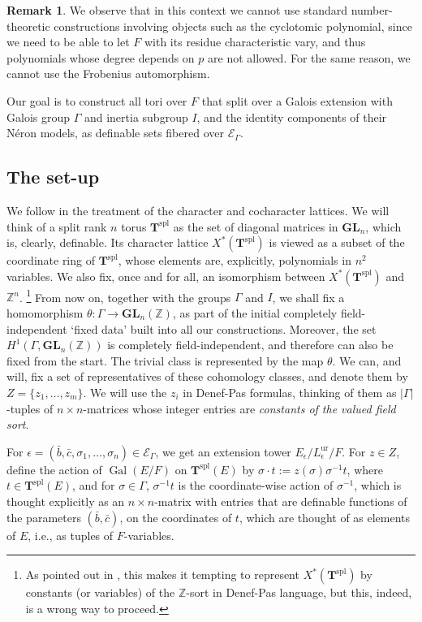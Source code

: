 \documentclass{amsart}
\newcommand{\Z}{{\mathbb Z}}
\newcommand{\GL}{\mathbf {GL}}
\newcommand{\gal}{\operatorname{Gal}}
\newcommand{\ur}{\mathrm{ur}}
\newcommand{\bT}{\mathbf {T}}
\newcommand\cE{{\mathcal E}}
\newcommand\spl{\mathrm{spl}}
\theoremstyle{plain}
\theoremstyle{definition}
\newtheorem{rem}[thm]{Remark}
\begin{document}
\begin{rem} We observe that in this context we cannot use standard number-theoretic constructions involving objects such as the cyclotomic polynomial, since we need to be able to let $F$ with its residue characteristic vary, and thus polynomials whose degree depends on $p$ are not allowed. For the same reason, we cannot use the Frobenius automorphism.  
\end{rem}
Our goal is to construct all tori over $F$ that split over a Galois extension with Galois group 
$\Gamma$ and inertia subgroup $I$, and the identity components of their N\'eron models, as 
definable sets fibered over $\cE_\Gamma$.  

\subsection{The set-up}
We follow \cite{cluckers-hales-loeser} in the treatment of the character and cocharacter lattices.
We will think of a split rank $n$ torus ${\bT}^\spl$ as the set of diagonal matrices in $\GL_n$, which is, clearly, definable. Its character lattice $X^\ast({\bT}^\spl)$ is viewed as a subset of the coordinate ring of $\bT^\spl$, whose elements are, explicitly, polynomials in $n^2$ variables. 
We also fix, once and for all, an isomorphism between $X^\ast(\bT^\spl)$ and $\Z^n$. 
\footnote{As pointed out in \cite{cluckers-hales-loeser}, this makes it tempting to represent 
$X^\ast(\bT^\spl)$ by constants (or variables) of the $\Z$-sort in Denef-Pas language, but this, indeed, is a wrong way to proceed.}
From now on, together with the groups $\Gamma$ and $I$, we shall fix a homomorphism
$\theta:\Gamma \to \GL_n(\Z)$, as part of the initial completely field-independent `fixed data' built into all our constructions.
Moreover, the set $H^1(\Gamma, \GL_n(\Z))$ is completely field-independent, and therefore can also be fixed from the start. The trivial class is represented by the map $\theta$.  We can, and will, fix a set of representatives of these cohomology classes, and denote them by $Z=\{z_1, \dots, z_m\}$. We will use the $z_i$ in Denef-Pas formulas, thinking of them as $|\Gamma|$-tuples of $n\times n$-matrices whose integer entries are \emph{constants of the valued  field sort}. 
 
For $\epsilon=(\bar b, \bar c, \sigma_1, \dots, \sigma_n)\in \cE_\Gamma$, we get an extension tower 
$E_\epsilon/L_\epsilon^\ur/F$. For $z\in Z$, define the action of $\gal(E/F)$ on $\bT^\spl(E)$ by
$\sigma\cdot  t:=z(\sigma)\sigma^{-1}t$, where $t\in \bT^\spl(E)$, and for $\sigma\in \Gamma$, 
$\sigma^{-1}t$ is the coordinate-wise action of $\sigma^{-1}$, which is thought explicitly as an $n\times n$-matrix with entries that are definable functions of the parameters $(\bar b, \bar c)$, on the coordinates of $t$, which are thought of as elements of $E$, i.e., as tuples of $F$-variables. 
\end{document}

